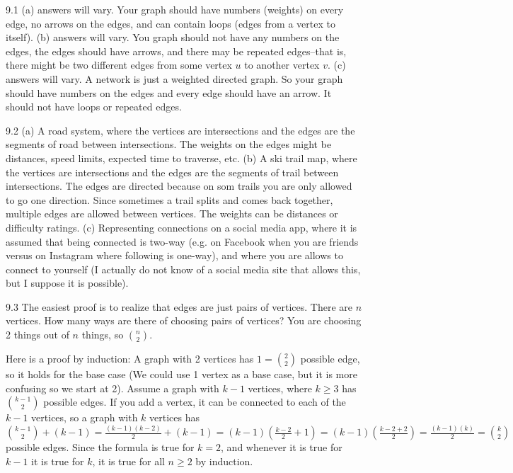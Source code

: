 \begin{RequAnswer}{9.1}
(a) answers will vary. Your graph should have numbers (weights) on every edge,
no arrows on the edges, and can contain loops (edges from a vertex to itself).
(b) answers will vary. You graph should not have any numbers on the edges,
the edges should have arrows, and there may be repeated edges--that is, there
might be two different edges from some vertex $u$ to another vertex $v$.
(c) answers will vary. A network is just a weighted directed graph.
So your graph should have numbers on the edges and every edge should have an arrow.
It should not have loops or repeated edges.
\end{RequAnswer}
\begin{RequAnswer}{9.2}
(a) A road system, where the vertices are intersections and the edges are the segments of road between intersections.
The weights on the edges might be distances, speed limits, expected time to traverse, etc.
(b) A ski trail map, where the vertices are intersections and the edges are the segments of trail between intersections.
The edges are directed because on som trails you are only allowed to go one direction.
Since sometimes a trail splits and comes back together, multiple edges are allowed between vertices.
The weights can be distances or difficulty ratings.
(c) Representing connections on a social media app, where it is assumed that being connected is two-way
(e.g. on Facebook when you are friends versus on Instagram where following is one-way), and where you are
allows to connect to yourself (I actually do not know of a social media site that allows this, but I suppose it is possible).
\end{RequAnswer}
\begin{RequAnswer}{9.3}
The easiest proof is to realize that edges are just pairs of vertices. There are $n$ vertices. How many ways are there of
choosing pairs of vertices? You are choosing 2 things out of $n$ things, so $\binom{n}{2}$.

Here is a proof by induction: A graph with 2 vertices has $1=\binom{2}{2}$ possible edge, so it holds for the base case
(We could use 1 vertex as a base case, but it is more confusing so we start at 2).
Assume a graph with $k-1$ vertices, where $k\geq 3$ has $\binom{k-1}{2}$ possible edges.
If you add a vertex, it can be connected to each of
the $k-1$ vertices, so a graph with $k$ vertices has
$\binom{k-1}{2}+(k-1) = \frac{(k-1)(k-2)}{2}+(k-1) = (k-1)\left(\frac{k-2}{2} + 1\right)
= (k-1)\left(\frac{k-2+2}{2}\right)
=\frac{(k-1)(k)}{2}=\binom{k}{2}$ possible edges.
Since the formula is true for $k=2$, and whenever it is true for $k-1$ it is true for $k$, it is true for all $n\geq 2$ by induction.
\end{RequAnswer}
